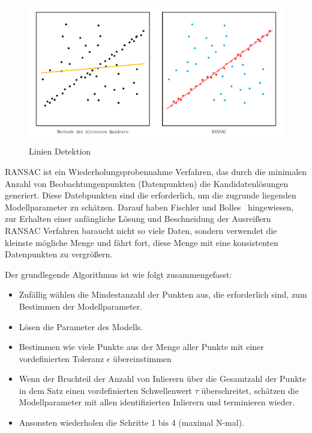 \begin{figure}[H]
 \centering 
 \includegraphics[keepaspectratio,width=1.0\textwidth]{images/3_Ersteverfahren/RANSAC/Linien_Detektion.pdf}
 \caption{Linien Detektion}
 \label{fig:Linien Detektion}
\end{figure} 

RANSAC ist ein Wiederholungsprobennahme Verfahren, das  durch die minimalen Anzahl von Beobachtungenpunkten (Datenpunkten) die Kandidatenlösungen generiert. Diese Datebpunkten sind die erforderlich, um die zugrunde liegenden Modellparameter zu schätzen. Darauf haben Fischler und Bolles~\cite{ransac1} hingewiesen, zur Erhalten einer anfängliche Lösung und Beschneidung der Ausreißern RANSAC Verfahren baraucht nicht so viele Daten, sondern verwendet die kleinste mögliche Menge und fährt fort, diese Menge mit eine konsistenten Datenpunkten zu vergrößern.

Der grundlegende Algorithmus ist wie folgt zusammengefasst:

\begin{itemize}
	\item Zufällig wählen die Mindestanzahl der Punkten aus, die erforderlich sind, zum Bestimmen der Modellparameter.
	\item Lösen die Parameter des Modells.
	\item Bestimmen wie viele Punkte aus der Menge aller Punkte mit einer vordefinierten Toleranz $\epsilon$ übereinstimmen
	\item Wenn der Bruchteil der Anzahl von Inlierern über die Gesamtzahl der Punkte in dem Satz einen vordefinierten Schwellenwert $\tau$ überschreitet, schätzen die Modellparameter mit allen identifizierten Inlierern und terminieren wieder.
	\item Ansonsten wiederholen die Schritte 1 bis 4 (maximal N-mal).
\end{itemize}

